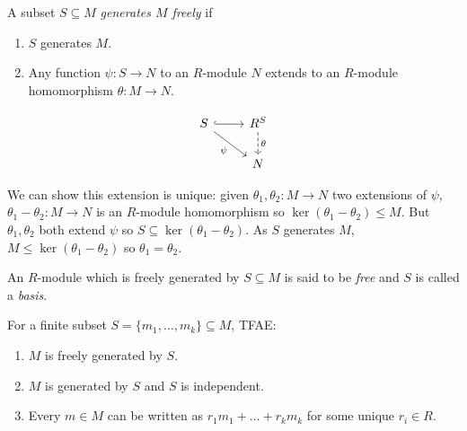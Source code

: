 \documentclass[a4paper]{article}
\theoremstyle{definition}
\begin{document}
\begin{definition}
  A subset \(S \subseteq M\) \emph{generates \(M\) freely} if
    \begin{enumerate}
    \item \(S\) generates \(M\).
    \item Any function \(\psi: S \to N\) to an \(R\)-module \(N\) extends to an \(R\)-module homomorphism \(\theta: M \to N\).
    \end{enumerate}
    \[
      \begin{tikzcd}
        S \ar[r, hook] \ar[dr, "\psi"'] & R^S \ar[d, dashed, "\theta"] \\
        & N
      \end{tikzcd}
    \]
\end{definition}

\begin{note}
  We can show this extension is unique: given \(\theta_1, \theta_2: M \to N\) two extensions of \(\psi\), \(\theta_1 - \theta_2:M \to N\) is an \(R\)-module homomorphism so \(\ker(\theta_1 - \theta_2) \leq M\). But \(\theta_1, \theta_2\) both extend \(\psi\) so \(S \subseteq \ker(\theta_1 - \theta_2)\). As \(S\) generates \(M\), \(M \leq \ker(\theta_1 - \theta_2)\) so \(\theta_1 = \theta_2\).
\end{note}

An \(R\)-module which is freely generated by \(S \subseteq M\) is said to be \emph{free} and \(S\) is called a \emph{basis}.

\begin{proposition}
  For a finite subset \(S = \{m_1, \dots, m_k\} \subseteq M\), TFAE:
  \begin{enumerate}
  \item \(M\) is freely generated by \(S\).
  \item \(M\) is generated by \(S\) and \(S\) is independent.
  \item Every \(m \in M\) can be written as \(r_1m_1 + \dots + r_km_k\) for some unique \(r_i \in R\).
  \end{enumerate}
\end{proposition}
\end{document}
